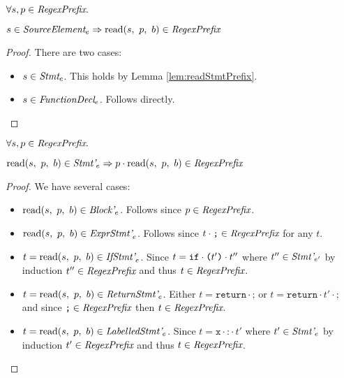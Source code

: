 \documentclass[preprint,10pt]{sigplanconf}
\begin{document}
\begin{lemma}\mbox{}
  
  \( \forall s, p \in \textit{RegexPrefix}. \)

  \( 
  s \in \textit{SourceElement}_{e} \Rightarrow 
  \textrm{read}(s,~p,~b) \in \textit{RegexPrefix}
  \)
\end{lemma}
\begin{proof}
  There are two cases:
  \begin{itemize}
  \item \( s \in \textit{Stmt}_{e} \). This holds by
    Lemma \ref{lem:readStmtPrefix}.

  \item \( s \in \textit{FunctionDecl}_{e} \). Follows directly.
  \end{itemize}
\end{proof}

\begin{lemma}\mbox{}

  \( \forall s, p \in \textit{RegexPrefix}. \)

  \( \textrm{read}(s,~p,~b) \in \textit{Stmt'}_{e} \Rightarrow p \cdot \textrm{read}(s,~p,~b) \in \textit{RegexPrefix} \)
\end{lemma}
\begin{proof}
  We have several cases:
  \begin{itemize}
  \item \( \textrm{read}(s,~p,~b) \in \textit{Block'}_{e} \). Follows since \(
    p \in \textit{RegexPrefix} \).

  \item \( \textrm{read}(s,~p,~b) \in \textit{ExprStmt'}_{e} \).
    Follows since \( t \cdot \texttt{;} \in \textit{RegexPrefix} \) for any \( t \).
    
  \item \( t = \textrm{read}(s,~p,~b) \in \textit{IfStmt'}_{e} \). Since
    \( t = \texttt{if}\cdot \texttt{(}t'\texttt{)}\cdot t'' \) where \( t'' \in
    \textit{Stmt'}_{e'} \) by induction \( t'' \in \textit{RegexPrefix} \) and
    thus \( t \in \textit{RegexPrefix} \).
    
  \item \( t = \textrm{read}(s,~p,~b) \in \textit{ReturnStmt'}_{e} \).
    Either \( t = \texttt{return}\cdot \texttt{;} \) 
    or \( t = \texttt{return}\cdot t' \cdot \texttt{;} \)
    and since \( \texttt{;} \in \textit{RegexPrefix} \) then \( t \in \textit{RegexPrefix} \).

  \item \( t = \textrm{read}(s,~p,~b) \in \textit{LabelledStmt'}_{e} \).
    Since \( t = \texttt{x}\cdot \texttt{:}\cdot t' \) where \( t' \in
    \textit{Stmt'}_{e} \) by induction \( t' \in \textit{RegexPrefix} \) and
    thus \( t \in \textit{RegexPrefix} \).

  \end{itemize}
\end{proof}
\end{document}
